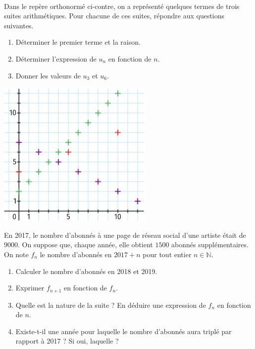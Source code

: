 \documentclass[11pt]{article}
\begin{document}
\begin{exo}~\\[-10mm]
  \begin{minipage}[]{.5\textwidth}
    Dans le repère orthonormé ci-contre, on a représenté quelques termes de
    trois suites arithmétiques. Pour chacune de ces suites, répondre aux
    questions suivantes.
    \begin{enumerate}
      \item Déterminer le premier terme et la raison.
      \item Déterminer l'expression de $u_n$ en fonction de $n$.
      \item Donner les valeurs de $u_3$ et $u_6$.
    \end{enumerate}
  \end{minipage}
  \begin{minipage}[]{.5\textwidth}
    \begin{center}
      \includegraphics[scale=.7]{graph.png}
    \end{center}
  \end{minipage}
\end{exo}

\begin{exo}
  En 2017, le nombre d'abonnés à une page de réseau social d'une artiste était
  de $9000$. On suppose que, chaque année, elle obtient $1500$ abonnés
  supplémentaires. On note $f_n$ le nombre d'abonnés en $2017+n$ pour tout
  entier $n\in\mathbb{N}$.
  \begin{enumerate}
    \item Calculer le nombre d'abonnés en 2018 et 2019.
    \item Exprimer $f_{n+1}$ en fonction de $f_n$.
    \item Quelle est la nature de la suite ? En déduire une expression de $f_n$
      en fonction de $n$.
    \item Existe-t-il une année pour laquelle le nombre d'abonnés aura triplé
      par rapport à 2017 ? Si oui, laquelle ?
  \end{enumerate}
\end{exo}
\end{document}
